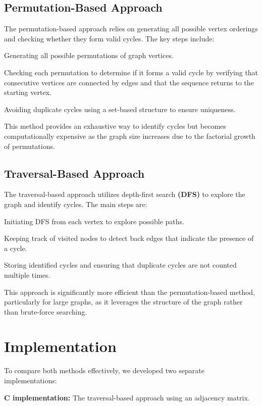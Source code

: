\documentclass{sbc2023}%
\begin{document}
\subsection{Permutation-Based Approach}

The permutation-based approach relies on generating all possible vertex orderings and checking whether they form valid cycles. The key steps include:

Generating all possible permutations of graph vertices.

Checking each permutation to determine if it forms a valid cycle by verifying that consecutive vertices are connected by edges and that the sequence returns to the starting vertex.

Avoiding duplicate cycles using a set-based structure to ensure uniqueness.

This method provides an exhaustive way to identify cycles but becomes computationally expensive as the graph size increases due to the factorial growth of permutations.

\subsection{Traversal-Based Approach}

The traversal-based approach utilizes depth-first search \textbf{(DFS)} to explore the graph and identify cycles. The main steps are:

Initiating DFS from each vertex to explore possible paths.

Keeping track of visited nodes to detect back edges that indicate the presence of a cycle.

Storing identified cycles and ensuring that duplicate cycles are not counted multiple times.

This approach is significantly more efficient than the permutation-based method, particularly for large graphs, as it leverages the structure of the graph rather than brute-force searching.

\section{Implementation}

To compare both methods effectively, we developed two separate implementations:

\textbf{C implementation:} The traversal-based approach using an adjacency matrix.
\end{document}
